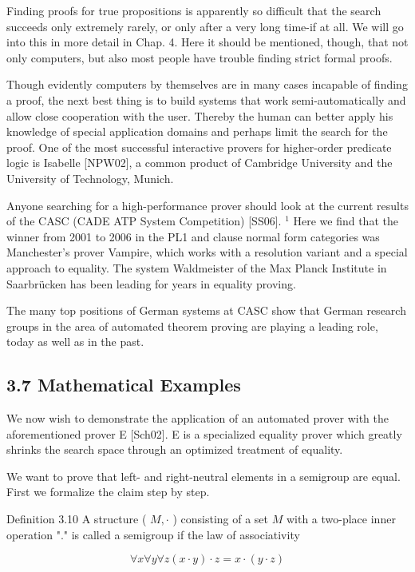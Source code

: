 \documentclass[10pt]{article}
\begin{document}
Finding proofs for true propositions is apparently so difficult that the search succeeds only extremely rarely, or only after a very long time-if at all. We will go into this in more detail in Chap. 4. Here it should be mentioned, though, that not only computers, but also most people have trouble finding strict formal proofs.

Though evidently computers by themselves are in many cases incapable of finding a proof, the next best thing is to build systems that work semi-automatically and allow close cooperation with the user. Thereby the human can better apply his knowledge of special application domains and perhaps limit the search for the proof. One of the most successful interactive provers for higher-order predicate logic is Isabelle [NPW02], a common product of Cambridge University and the University of Technology, Munich.

Anyone searching for a high-performance prover should look at the current results of the CASC (CADE ATP System Competition) [SS06]. ${ }^{1}$ Here we find that the winner from 2001 to 2006 in the PL1 and clause normal form categories was Manchester's prover Vampire, which works with a resolution variant and a special approach to equality. The system Waldmeister of the Max Planck Institute in Saarbrücken has been leading for years in equality proving.

The many top positions of German systems at CASC show that German research groups in the area of automated theorem proving are playing a leading role, today as well as in the past.

\subsection*{3.7 Mathematical Examples}
We now wish to demonstrate the application of an automated prover with the aforementioned prover E [Sch02]. E is a specialized equality prover which greatly shrinks the search space through an optimized treatment of equality.

We want to prove that left- and right-neutral elements in a semigroup are equal. First we formalize the claim step by step.

Definition 3.10 A structure ( $M, \cdot$ ) consisting of a set $M$ with a two-place inner operation "." is called a semigroup if the law of associativity

$$
\forall x \forall y \forall z(x \cdot y) \cdot z=x \cdot(y \cdot z)
$$
\end{document}
